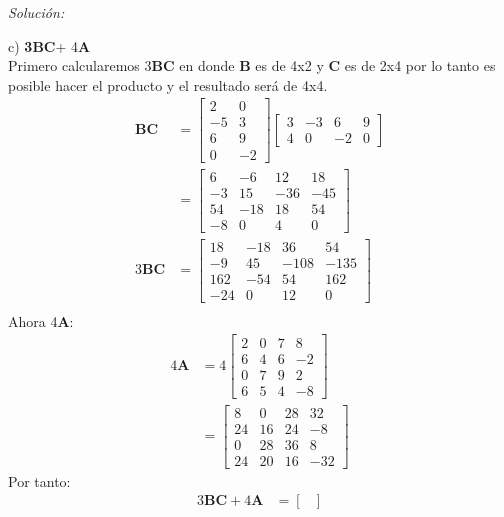 \documentclass[12pt]{article}
\newenvironment{sol}
    {\emph{Solución:}
    }
    {
    }
\begin{document}
\begin{sol}
c) \textbf{3BC}+ 4\textbf{A}\\
Primero calcularemos 3\textbf{BC} en donde \textbf{B} es de 4x2 y \textbf{C} es de 2x4 por lo tanto es posible hacer el producto y el resultado será de 4x4.\\
\begin{align*}
	\textbf{BC} &= 
	\begin{bmatrix}
		2 & 0 \\
		-5 & 3 \\
		6 & 9 \\
		0 & -2
	\end{bmatrix}
	\begin{bmatrix}
		3 & -3 & 6 & 9 \\
		4 & 0 & -2 & 0
	\end{bmatrix} \\
	&= \begin{bmatrix}
		6 & -6 & 12 & 18 \\
		-3 & 15 & -36 & -45 \\
		54 & -18 & 18 & 54 \\
		-8 & 0 & 4 & 0
	\end{bmatrix}\\
	3\textbf{BC}&=
	\begin{bmatrix}
		18 & -18 & 36 & 54 \\
		-9 & 45 & -108 & -135 \\
		162 & -54 & 54 & 162 \\
		-24 & 0 & 12 & 0
	\end{bmatrix}\\
	\end{align*}
Ahora 4\textbf{A}:
\begin{align*}
	4\textbf{A} &= 4
	\begin{bmatrix}
		2 & 0 & 7 & 8 \\
		6 & 4 & 6 & -2 \\
		0 & 7 & 9 & 2 \\
		6 & 5 & 4 & -8
	\end{bmatrix} \\
	&= \begin{bmatrix}
		8 & 0 & 28 & 32 \\
		24 & 16 & 24 & -8 \\
		0 & 28 & 36 & 8 \\
		24 & 20 & 16 & -32
	\end{bmatrix}
\end{align*}
Por tanto:
\begin{align*}
3\textbf{BC}+4\textbf{A} &=
\begin{bmatrix}

\end{bmatrix}
\end{align*}
\end{sol}
\end{document}
